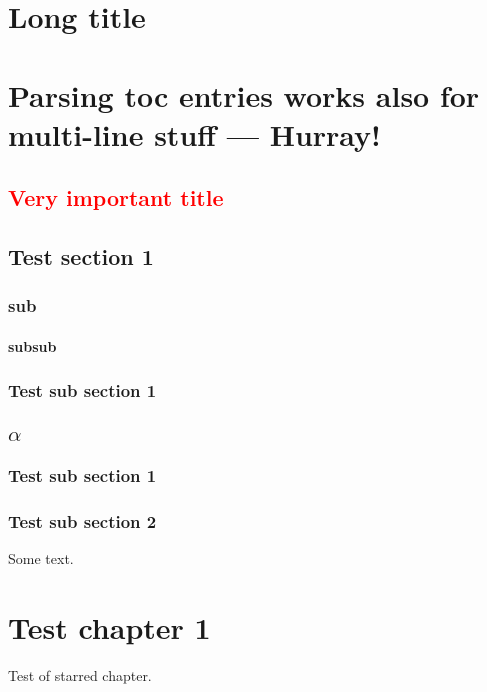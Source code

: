 \chapter[Short title]{Long title}

\chapter{Parsing {toc entries works
  also for} multi-line \texorpdfstring{stuff}{entries}
--- Hurray!}

\section{\texorpdfstring{\textcolor{red}{Very important title}} {Very important title}}

\section{Test section 1}

\subsection{sub}

\subsubsection{subsub}


\subsection{Test sub section 1}

\section{$\alpha$}

\subsection{Test sub section 1}

\subsection{Test sub section 2}
Some text.

\chapter*{Test chapter 1}
Test of starred chapter.


